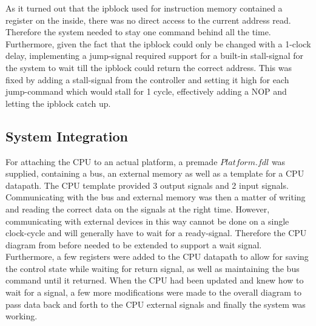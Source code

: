 \documentclass[12pt,a4paper]{article}
\begin{document}
	As it turned out that the ipblock used for instruction memory contained a register on the inside, there was no direct access to the current address read. Therefore the system needed to stay one command behind all the time. 
	Furthermore, given the fact that the ipblock could only be changed with a 1-clock delay, implementing a jump-signal required support for a built-in stall-signal for the system to wait till the ipblock could return the correct address. This was fixed by adding a stall-signal from the controller and setting it high for each jump-command which would stall for 1 cycle, effectively adding a NOP and letting the ipblock catch up.
	
\subsection{System Integration}
	For attaching the CPU to an actual platform, a premade $Platform.fdl$ was supplied, containing a bus, an external memory as well as a template for a CPU datapath. The CPU template provided 3 output signals and 2 input signals. Communicating with the bus and external memory was then a matter of writing and reading the correct data on the signals at the right time. However, communicating with external devices in this way cannot be done on a single clock-cycle and will generally have to wait for a ready-signal. Therefore the CPU diagram from before needed to be extended to support a wait signal. 
Furthermore, a few registers were added to the CPU datapath to allow for saving the control state while waiting for return signal, as well as maintaining the bus command until it returned.
	When the CPU had been updated and knew how to wait for a signal, a few more modifications were made to the overall diagram to pass data back and forth to the CPU external signals and finally the system was working.
	
\end{document}
